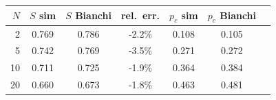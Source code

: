 \begin{tabular}{@{}rcccccc@{}}
\toprule
$N$ & $S$ sim & $S$ Bianchi & rel.\ err. & $p_c$ sim & $p_c$ Bianchi \\
\midrule
2 & 0.769 & 0.786 & -2.2\% & 0.108 & 0.105 \\
5 & 0.742 & 0.769 & -3.5\% & 0.271 & 0.272 \\
10 & 0.711 & 0.725 & -1.9\% & 0.364 & 0.384 \\
20 & 0.660 & 0.673 & -1.8\% & 0.463 & 0.481 \\
\bottomrule
\end{tabular}
